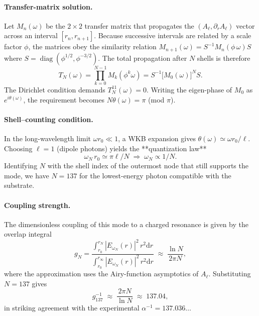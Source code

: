 \documentclass[12pt]{report}
\newcommand{\dd}{\mathrm{d}}
\begin{document}
\paragraph{Transfer-matrix solution.}  Let $M_n(\omega)$ be the $2\times2$ transfer matrix that propagates the $(A_\ell,\partial_r A_\ell)$ vector across an interval $[r_n,r_{n+1}]$.  Because successive intervals are related by a scale factor $\phi$, the matrices obey the similarity relation $M_{n+1}(\omega)=S^{-1}M_n(\phi\,\omega)S$ where $S=\operatorname{diag}(\phi^{1/2},\phi^{-3/2})$.  The total propagation after $N$ shells is therefore
\begin{equation}
    T_N(\omega)=\prod_{k=0}^{N-1}M_k(\phi^{k}\omega)=S^{-1}\bigl[M_0(\omega)\bigr]^NS.
\end{equation}
The Dirichlet condition demands $T_N^{11}(\omega)=0$.  Writing the eigen-phase of $M_0$ as $e^{i\theta(\omega)}$, the requirement becomes $N\theta(\omega)=\pi$ (mod $\pi$).

\paragraph{Shell–counting condition.}  In the long-wavelength limit $\omega r_0\ll1$, a WKB expansion gives $\theta(\omega)\simeq\omega r_0/\ell$.  Choosing $\ell=1$ (dipole photons) yields the **quantization law**
\begin{equation}\label{eq:quant_law}
    \omega_{N}\,r_0 \simeq \pi\ell/ N \;\Longrightarrow\; \omega_N\propto 1/N.
\end{equation}
Identifying $N$ with the shell index of the outermost node that still supports the mode, we have $N=137$ for the lowest-energy photon compatible with the substrate.

\paragraph{Coupling strength.}  The dimensionless coupling of this mode to a charged resonance is given by the overlap integral
\begin{equation}\label{eq:coupling}
    g_N = \frac{\displaystyle\int_{r_0}^{r_N}\!|E_{\omega_N}(r)|^2\,r^2\dd r}{\displaystyle\int_{r_0}^{r_{\infty}}\!|E_{\omega_N}(r)|^2\,r^2\dd r} \;\approx\; \frac{\ln N}{2\pi N},
\end{equation}
where the approximation uses the Airy-function asymptotics of $A_\ell$.  Substituting $N=137$ gives
\begin{equation}
    g_{137}^{-1}\;\approx\; \frac{2\pi N}{\ln N}\;\approx\;137.04,
\end{equation}
in striking agreement with the experimental $\alpha^{-1}=137.036\ldots$
\end{document}
